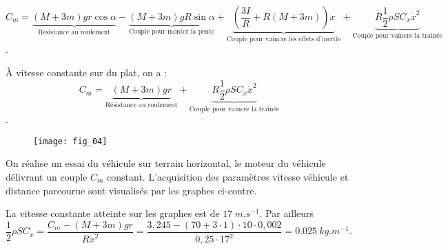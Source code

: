 \ifprof
\begin{corrige}

$$C_m=\underbrace{\left(M+3m\right)gr \cos \alpha}_{\text{Résistance au roulement}}-\underbrace{\left(M+3m\right)gR\sin \alpha}_{\text{Couple pour monter la pente}}+\underbrace{\left(\dfrac{3I}{R}+R\left(M+3m\right)\right)\ddot{x}}_{\text{Couple pour vaincre les effets d'inertie}} + \underbrace{R\dfrac{1}{2}\rho S C_x \dot{x}^2}_{\text{Couple pour vaincre la trainée}}$$. 

\end{corrige}
\else
\fi


\ifprof
\begin{corrige}
À vitesse constante sur du plat, on a :
$$C_m=\underbrace{\left(M+3m\right)gr}_{\text{Résistance au roulement}} + \underbrace{R\dfrac{1}{2}\rho S C_x \dot{x}^2}_{\text{Couple pour vaincre la trainée}}$$. 
\end{corrige}
\else
\fi

\ifprof
\else

\begin{figure}[!h]
\centering
\texttt{[image: fig\_04]}
\end{figure}

On réalise un essai du véhicule sur terrain horizontal, le moteur du véhicule délivrant un couple $C_m$ constant.   
 L’acquisition des paramètres vitesse véhicule et distance parcourue sont visualisés par les graphes ci-contre. 


\fi

\ifprof
\begin{corrige}
La vitesse constante atteinte sur les graphes est de $\SI{17}{m.s^{-1}}$.  Par ailleurs 
$\dfrac{1}{2}\rho S C_x=\dfrac{C_m-\left(M+3m\right)gr}{R\dot{x}^2} =\dfrac{3,245-\left(70+3\cdot 1\right)\cdot 10 \cdot 0,002}{0,25\cdot 17^2}=\SI{0,025}{kg.m^{-1}}.$
\end{corrige}
\else
\fi


